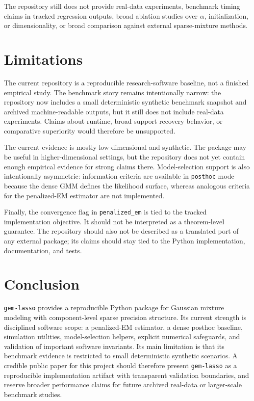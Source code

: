 \documentclass[10pt]{article}
\begin{document}


The repository still does not provide real-data experiments, benchmark timing
claims in tracked regression outputs, broad ablation studies over $\alpha$,
initialization, or dimensionality, or broad comparison against external
sparse-mixture methods.


\section{Limitations}

The current repository is a reproducible research-software baseline, not a
finished empirical study. The benchmark story remains intentionally narrow: the
repository now includes a small deterministic synthetic benchmark snapshot and
archived machine-readable outputs, but it still does not include real-data
experiments. Claims about runtime, broad support recovery behavior, or
comparative superiority would therefore be unsupported.

The current evidence is mostly low-dimensional and synthetic. The package may
be useful in higher-dimensional settings, but the repository does not yet
contain enough empirical evidence for strong claims there. Model-selection
support is also intentionally asymmetric: information criteria are available in
\texttt{posthoc} mode because the dense GMM defines the likelihood surface,
whereas analogous criteria for the penalized-EM estimator are not implemented.

Finally, the convergence flag in \texttt{penalized\_em} is tied to the tracked
implementation objective. It should not be interpreted as a theorem-level
guarantee. The repository should also not be described as a translated port of
any external package; its claims should stay tied to the Python implementation,
documentation, and tests.

\section{Conclusion}

\texttt{gem-lasso} provides a reproducible Python package for Gaussian mixture
modeling with component-level sparse precision structure. Its current strength
is disciplined software scope: a penalized-EM estimator, a dense posthoc
baseline, simulation utilities, model-selection helpers, explicit numerical
safeguards, and validation of important software invariants. Its main limitation
is that its benchmark evidence is restricted to small deterministic synthetic
scenarios. A credible public paper for this project should therefore present
\texttt{gem-lasso} as a reproducible implementation artifact with transparent
validation boundaries, and reserve broader performance claims for future
archived real-data or larger-scale benchmark studies.



\end{document}
